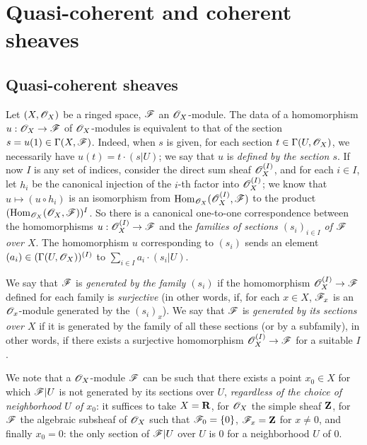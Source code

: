\section{Quasi-coherent and coherent sheaves}
\label{section:0.5}

\subsection{Quasi-coherent sheaves}
\label{subsection:0.5.1}

\begin{env}[5.1.1]
\label{0.5.1.1}
Let $(X,\mathscr{O}_X)$ be a ringed space, $\mathscr{F}$ an $\mathscr{O}_X$-module.
The data of a homomorphism $u:\sh{O}_X\to\sh{F}$ of $\mathscr{O}_X$-modules is equivalent to that of the section $s=u(1)\in\Gamma(X,\mathscr{F})$.
Indeed, when $s$ is given, for each section $t\in\Gamma(U,\mathscr{O}_X)$, we necessarily have $u(t)=t\cdot(s|U)$;
we say that $u$ is \emph{defined by the section $s$}.
If now $I$ is any set of indices, consider the direct sum sheaf $\mathscr{O}_X^{(I)}$, and for each $i\in I$, let $h_i$ be the canonical injection of the $i$-th factor into $\mathscr{O}_X^{(I)}$;
we know that $u\mapsto(u\circ h_i)$ is an isomorphism from ${\mathop{\mathrm{Hom}}\nolimits}_{\mathscr{O}_X}(\mathscr{O}_X^{(I)},\mathscr{F})$ to the product $({\mathop{\mathrm{Hom}}\nolimits}_{\mathscr{O}_X}(\mathscr{O}_X,\mathscr{F}))^I$.
So there is a canonical one-to-one correspondence between the homomorphisms $u:\sh{O}_X^{(I)}\to\sh{F}$ and the \emph{families of sections $(s_i)_{i\in I}$ of $\mathscr{F}$ over $X$}.
The homomorphism $u$ corresponding to $(s_i)$ sends an element $(a_i)\in(\Gamma(U,\mathscr{O}_X))^{(I)}$ to $\sum_{i\in I}a_i\cdot(s_i|U)$.

We say that $\mathscr{F}$ is \emph{generated by the family $(s_i)$} if the homomorphism $\sh{O}_X^{(I)}\to\sh{F}$ defined
for each family is \emph{surjective} (in other words, if, for each $x\in X$, $\mathscr{F}_x$ is an $\mathscr{O}_x$-module generated by the $(s_i)_x$).
We say that $\mathscr{F}$ is \emph{generated by its sections over $X$} if it is generated by the family of all these sections (or by a subfamily), in other words, if there exists a surjective homomorphism $\sh{O}_X^{(I)}\to\sh{F}$ for a suitable $I$.

We note that a $\mathscr{O}_X$-module $\mathscr{F}$ can be such that there exists a point $x_0\in X$ for which $\mathscr{F}|U$ is not generated by its sections over $U$, \emph{regardless of the choice of neighborhood $U$ of $x_0$}:
it suffices to take $X=\mathbf{R}$, for $\mathscr{O}_X$ the simple sheaf $\mathbf{Z}$, for $\mathscr{F}$ the algebraic subsheaf of $\mathscr{O}_X$ such that $\mathscr{F}_0=\{0\}$, $\mathscr{F}_x=\mathbf{Z}$ for $x\neq 0$, and finally $x_0=0$:
the only section of $\mathscr{F}|U$ over $U$ is $0$ for a neighborhood $U$ of $0$.
\end{env}

